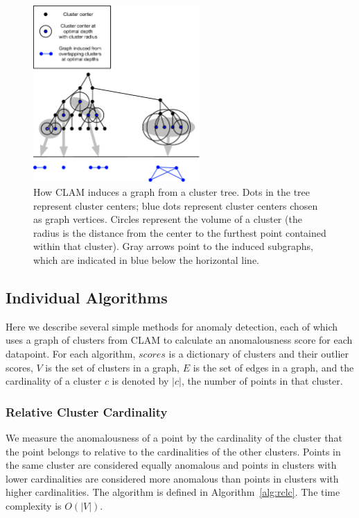 \begin{figure}[ht!]
    \centering
    \includegraphics[width=2.5in]{images/tree-graph.pdf}
    \caption{How CLAM induces a graph from a cluster tree.
        Dots in the tree represent cluster centers;
        blue dots represent cluster centers chosen as graph vertices.
        Circles represent the volume of a cluster (the radius is the distance from the center to the furthest point contained within that cluster).
        Gray arrows point to the induced subgraphs, which are indicated in blue below the horizontal line.}
    \label{fig:methods:graph-generation}
\end{figure}


\subsection{Individual Algorithms}
\label{subsec:methods:individual-algorithms}

Here we describe several simple methods for anomaly detection, each of which uses a graph of clusters from CLAM to calculate an anomalousness score for each datapoint.
For each algorithm, $scores$ is a dictionary of clusters and their outlier scores,
$V$ is the set of clusters in a graph,
$E$ is the set of edges in a graph, and
the cardinality of a cluster $c$ is denoted by $|c|$, the number of points in that cluster.

\subsubsection{Relative Cluster Cardinality}
We measure the anomalousness of a point by the cardinality of the cluster that the point belongs to relative to the cardinalities of the other clusters.
Points in the same cluster are considered equally anomalous and points in clusters with lower cardinalities are considered more anomalous than points in clusters with higher cardinalities.
The algorithm is defined in Algorithm~\ref{alg:rclc}.
The time complexity is $O(|V|)$.

